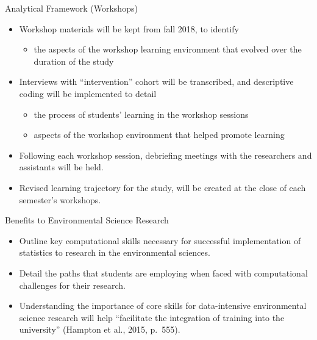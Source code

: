 \documentclass[10pt,ignorenonframetext,]{beamer}
\providecommand{\tightlist}{%
  \setlength{\itemsep}{0pt}\setlength{\parskip}{0pt}}
\begin{document}
\begin{frame}{Analytical Framework (Workshops)}

\begin{itemize}[<+->]
\item
  Workshop materials will be kept from fall 2018, to identify

  \begin{itemize}[<+->]
  \tightlist
  \item
    the aspects of the workshop learning environment that evolved over
    the duration of the study
  \end{itemize}
\item
  Interviews with ``intervention'' cohort will be transcribed, and
  descriptive coding will be implemented to detail

  \begin{itemize}[<+->]
  \tightlist
  \item
    the process of students' learning in the workshop sessions
  \item
    aspects of the workshop environment that helped promote learning
  \end{itemize}
\item
  Following each workshop session, debriefing meetings with the
  researchers and assistants will be held.
\item
  Revised learning trajectory for the study, will be created at the
  close of each semester's workshops.
\end{itemize}

\end{frame}

\begin{frame}{Benefits to Environmental Science Research}

\begin{itemize}[<+->]
\item
  Outline key computational skills necessary for successful
  implementation of statistics to research in the environmental
  sciences.
\item
  Detail the paths that students are employing when faced with
  computational challenges for their research.
\item
  Understanding the importance of core skills for data-intensive
  environmental science research will help ``facilitate the integration
  of training into the university'' (Hampton et al., 2015, p.~555).
\end{itemize}

\end{frame}
\end{document}
